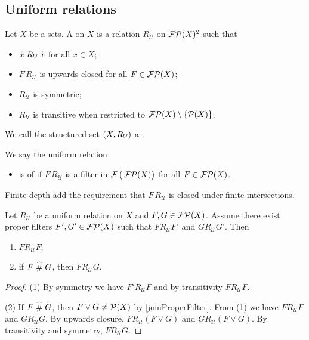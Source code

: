 \subsection{Uniform relations}
\begin{definition}
Let $X$ be a sets. A  on $X$ is a relation $R_\mathcal{U}$ on $\operatorname{\mathcal{FP}}(X)^2$ such that
\begin{itemize}
\item $\dot{x}\mathrel{R_\mathcal{U}}\dot{x}$ for all $x\in X$;
\item $F\,R_\mathcal{U}$ is upwards closed for all $F\in \operatorname{\mathcal{FP}}(X)$;
\item $R_\mathcal{U}$ is symmetric;
\item $R_\mathcal{U}$ is transitive when restricted to $\operatorname{\mathcal{FP}}(X)\setminus\{\operatorname{\mathcal{P}}(X)\}$.
\end{itemize}
We call the structured set $\left( X,R_\mathcal{U} \right)$ a .

We say the uniform relation
\begin{itemize}
\item  is of  if $F\,R_\mathcal{U}$ is a filter in $\operatorname{\mathcal{F}}\big(\operatorname{\mathcal{FP}}(X)\big)$ for all $F\in \operatorname{\mathcal{FP}}(X)$.
\end{itemize}
\end{definition}
Finite depth add the requirement that $F\,R_\mathcal{U}$ is closed under finite intersections.

\begin{lemma} \label{uniformRelationRelatedElementLemma}
Let $R_\mathcal{U}$ be a uniform relation on $X$ and $F,G\in\operatorname{\mathcal{FP}}(X)$. Assume there exist proper filters $F',G'\in\operatorname{\mathcal{FP}}(X)$ such that $F\mathrel{R_\mathcal{U}} F'$ and $G\mathrel{R_\mathcal{U}}G'$. Then
\begin{enumerate}
\item $F\mathrel{R_\mathcal{U}} F$;
\item if $F\mathrel{\widehat{\#}} G$, then $F\mathrel{R_\mathcal{U}} G$.
\end{enumerate}
\end{lemma}
\begin{proof}
(1) By symmetry we have $F'\mathrel{R_\mathcal{U}} F$ and by transitivity $F\mathrel{R_\mathcal{U}} F$.

(2) If $F\mathrel{\widehat{\#}} G$, then $F\vee G \neq \operatorname{\mathcal{P}}(X)$ by \ref{joinProperFilter}. From (1) we have $F\mathrel{R_\mathcal{U}} F$ and $G\mathrel{R_\mathcal{U}} G$. By upwards closure, $F\mathrel{R_\mathcal{U}} (F\vee G)$ and $G\mathrel{R_\mathcal{U}} (F\vee G)$. By transitivity and symmetry, $F\mathrel{R_\mathcal{U}} G$.
\end{proof}

